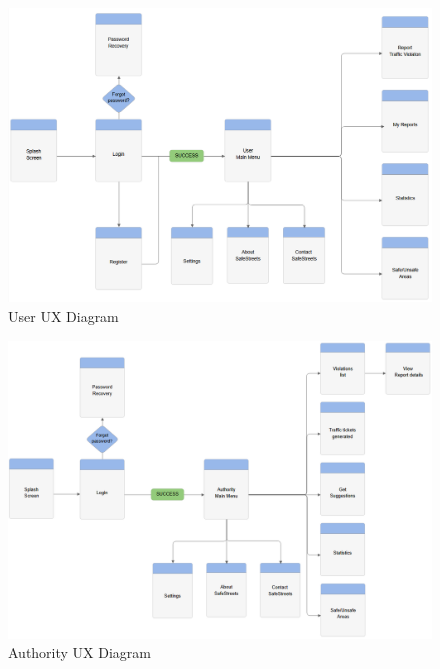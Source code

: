 \begin{figure}[H]
\advance\leftskip-3cm
    \includegraphics[width=1.5\textwidth,left]{Images/ux_user_definitivo.png}
    \caption{User UX Diagram}
\end{figure}
\begin{figure}[H]
\advance\leftskip-3cm
    \includegraphics[width=1.5\textwidth,left]{Images/ux_authority_definitivo.png}
    \caption{Authority UX Diagram}
\end{figure}
\cleardoublepage
